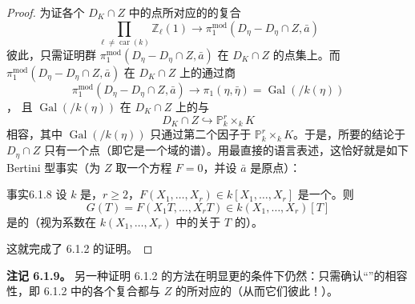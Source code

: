 \begin{proof}
为证各个 $D_K\cap Z$ 中的点所对应的的复合
\[
\prod_{\ell\neq\operatorname{car}(k)}\mathbb Z_\ell(1)
\longrightarrow\pi_1^{\mathrm{mod}}(D_\eta-D_\eta\cap Z,\bar a)
\]
彼此，只需证明群 $\pi_1^{\mathrm{mod}}(D_\eta-D_\eta\cap Z,\bar a)$ 在 $D_K\cap Z$ 的点集上。而 $\pi_1^{\mathrm{mod}}(D_\eta-D_\eta\cap Z,\bar a)$ 在 $D_K\cap Z$ 上的通过商
\[
\pi_1^{\mathrm{mod}}(D_\eta-D_\eta\cap Z,\bar a)
\longrightarrow\pi_1(\eta,\bar\eta)=\operatorname{Gal}(/k(\eta))
\]
，
且 $\operatorname{Gal}(/k(\eta))$ 在 $D_K\cap Z$ 上的与
\[
D_K\cap Z\hookrightarrow\mathbb P_k^r\times_kK
\]
相容，其中 $\operatorname{Gal}(/k(\eta))$ 只通过第二个因子于 $\mathbb P_k^r\times_kK$。于是，所要的结论于 $D_\eta\cap Z$ 只有一个点（即它是一个域的谱）。用最直接的语言表述，这恰好就是如下 Bertini 型事实（为 $Z$ 取一个方程 $F=0$，并设 $\bar a$ 是原点）：

\begin{SGAresult}{事实}{6.1.8}
设 $k$ 是，$r\geq2$，$F(X_1,\ldots,X_r)\in k[X_1,\ldots,X_r]$ 是一个。则
\[
G(T)=F(X_1T,\ldots,X_rT)\in k(X_1,\ldots,X_r)[T]
\]
是的（视为系数在 $k(X_1,\ldots,X_r)$ 中的关于 $T$ 的）。
\end{SGAresult}
这就完成了 6.1.2 的证明。
\end{proof}

\textbf{注记 6.1.9。} 另一种证明 6.1.2 的方法在明显更的条件下仍然：只需确认“”的相容性，即 6.1.2 中的各个复合都与 $Z$ 的所对应的（从而它们彼此！）。

